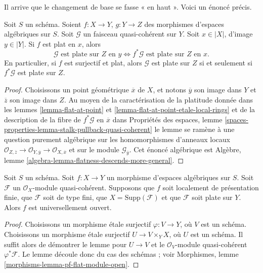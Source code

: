 \noindent
Il arrive que le changement de base se fasse « en haut ». Voici un énoncé précis.

\begin{lemma}
\label{lemma-flat-permanence}
Soit $S$ un schéma. Soient $f : X \to Y$, $g : Y \to Z$ des morphismes
d'espaces algébriques sur $S$. Soit $\mathcal{G}$ un faisceau quasi-cohérent sur $Y$.
Soit $x \in |X|$, d'image $y \in |Y|$.
Si $f$ est plat en $x$, alors
$$
\mathcal{G}\text{ est plate sur }Z\text{ en }y
\Leftrightarrow
f^*\mathcal{G}\text{ est plate sur }Z\text{ en }x.
$$
En particulier, si $f$ est surjectif et plat, alors
$\mathcal{G}$ est plate sur $Z$ si et seulement si
$f^*\mathcal{G}$ est plate sur $Z$.
\end{lemma}

\begin{proof}
Choisissons un point géométrique $\overline{x}$ de $X$, et notons
$\overline{y}$ son image dans $Y$ et $\overline{z}$ son image dans $Z$.
Au moyen de la caractérisation de la platitude donnée dans les
lemmes \ref{lemma-flat-at-point} et
\ref{lemma-flat-at-point-etale-local-rings}
et de la description de la fibre de $f^*\mathcal{G}$ en $\overline{x}$ dans
Propriétés des espaces,
lemme \ref{spaces-properties-lemma-stalk-pullback-quasi-coherent}
le lemme se ramène à une question purement algébrique sur les homomorphismes
d'anneaux locaux
$\mathcal{O}_{Z, \overline{z}} \to \mathcal{O}_{Y, \overline{y}}
\to \mathcal{O}_{X, \overline{x}}$
et sur le module $\mathcal{G}_{\overline{y}}$.
Cet énoncé algébrique est
Algèbre, lemme \ref{algebra-lemma-flatness-descends-more-general}.
\end{proof}

\begin{lemma}
\label{lemma-pf-flat-module-open}
Soit $S$ un schéma.
Soit $f : X \to Y$ un morphisme d'espaces algébriques sur $S$.
Soit $\mathcal{F}$ un $\mathcal{O}_X$-module quasi-cohérent.
Supposons que $f$ soit localement de présentation finie, que $\mathcal{F}$ soit de
type fini, que $X = \text{Supp}(\mathcal{F})$ et que
$\mathcal{F}$ soit plate sur $Y$. Alors $f$ est universellement ouvert.
\end{lemma}

\begin{proof}
Choisissons un morphisme étale surjectif $\varphi : V \to Y$, où $V$ est un schéma.
Choisissons un morphisme étale surjectif $U \to V \times_Y X$, où $U$ est un schéma.
Il suffit alors de démontrer le lemme pour $U \to V$ et le
$\mathcal{O}_V$-module quasi-cohérent $\varphi^*\mathcal{F}$.
Le lemme découle donc du cas des schémas ; voir
Morphismes, lemme \ref{morphisms-lemma-pf-flat-module-open}.
\end{proof}






